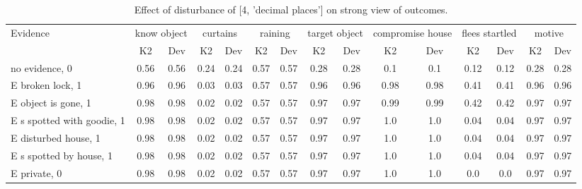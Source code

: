 \begin{table}\begin{tabular}{l|cc|cc|cc|cc|cc|cc|cc}\toprule\multirow{2}{*}{Evidence} & \multicolumn{2}{c}{know object}& \multicolumn{2}{c}{curtains}& \multicolumn{2}{c}{raining}& \multicolumn{2}{c}{target object}& \multicolumn{2}{c}{compromise house}& \multicolumn{2}{c}{flees startled}& \multicolumn{2}{c}{motive}\\& {K2} & {Dev}& {K2} & {Dev}& {K2} & {Dev}& {K2} & {Dev}& {K2} & {Dev}& {K2} & {Dev}& {K2} & {Dev}\\\midrule
no evidence, 0 & 0.56&0.56&0.24&0.24&0.57&0.57&0.28&0.28&0.1&0.1&0.12&0.12&0.28&0.28\\E broken lock, 1 & 0.96&0.96&0.03&0.03&0.57&0.57&0.96&0.96&0.98&0.98&0.41&0.41&0.96&0.96\\E object is gone, 1 & 0.98&0.98&0.02&0.02&0.57&0.57&0.97&0.97&0.99&0.99&0.42&0.42&0.97&0.97\\E s spotted with goodie, 1 & 0.98&0.98&0.02&0.02&0.57&0.57&0.97&0.97&1.0&1.0&0.04&0.04&0.97&0.97\\E disturbed house, 1 & 0.98&0.98&0.02&0.02&0.57&0.57&0.97&0.97&1.0&1.0&0.04&0.04&0.97&0.97\\E s spotted by house, 1 & 0.98&0.98&0.02&0.02&0.57&0.57&0.97&0.97&1.0&1.0&0.04&0.04&0.97&0.97\\E private, 0 & 0.98&0.98&0.02&0.02&0.57&0.57&0.97&0.97&1.0&1.0&0.0&0.0&0.97&0.97\\\bottomrule\end{tabular}\caption{Effect of disturbance of [4, 'decimal places'] on strong view of outcomes.}\end{table}
